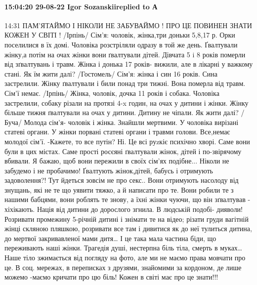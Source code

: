  
 
 
 
 

\paragraph{15:04:20 29-08-22 Igor Sozanskiireplied to А}
14:31
ПАМ'ЯТАЙМО І НІКОЛИ НЕ ЗАБУВАЙМО !
ПРО ЦЕ ПОВИНЕН ЗНАТИ КОЖЕН У СВІТІ !
/Ірпінь/
Сім'я: чоловік, жінка,три доньки
5,8,17 р.
Орки поселилися в їх домі.
Чоловіка розстріляли одразу в той же день. Ґвалтували жінку,а потім на очах
жінки вони ґвалтували дітей. Дівчата 5 i 8 років померли від зґвалтувань і
травм. Жінка і донька 17 років- вижили, але в лікарні у важкому стані. Як їм
жити далі?
/Гостомель/
Сім'я: жінка і син 16 років.
Сина застрелили. Жінку ґвалтували і
били понад три тижні. Вона померла від
травм. Сім'ї немає.
/Ірпінь/
Жінка, чоловік, дочка 11 років і
собака.
Чоловіка застрелили, собаку різали
на протязі 4-x годин, на очах у дитини і жінки. Жінку більше тижня ґвалтували
на очах у дитини. Дитину не чіпали. Як
жити далі?
/Буча/
Молода сім'я- чоловік і жінка.
Знайшли мертвими. У чоловіка вирізані статеві органи. У жінки порвані статеві
органи і травми голови. Все,немає молодої сім'ї.
-Кажете, то все путін? Ні. Це всі
руzкіє психічно хворі. Саме вони були в цих містах. Саме прості росєяні ґвалтували
жінок, дітей і по-звірячому вбивали.
Я бажаю, щоб вони пережили в своїх
сім'ях подібне...
Ніколи не забудемо і не
пробачимо!
Ґвалтують жінок,дітей, бабусь і
отримують задоволення?!
Тут йдеться зовсім не про секс..
Вони отримують насолоду від знущань, які не те що уявити тяжко, а й написати
про те. Вони робили те з нашими бабцями, вони роблять те знову, а їхні жінки
чуючи, що він зґвалтував - хіхікають.
Нація від дитини до дорослого
згнила. В людській подобі- дияволи!
Розривати промежину 5-річній дитині
і знімати те на відео; різати груди вагітній жінці скляною пляшкою, розривати
все там і дивитися як до неї тулиться дитина, до мертвої закривавленої
мами дитя…
І це така мала частина біди,
що переживають наші жінки. Трагедія душі, нестерпна біль тіла, смерть в муках…
Наше тіло зжимається від погляду
на фото, але ми не маємо права мовчати про це. В соц. мережах, в
переписках з друзями, знайомими за кордоном, де лише можемо -маємо кричати про
цю біль!
Кожен в світі має про це знати!!!
